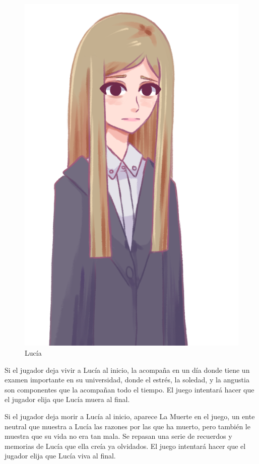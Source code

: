 \documentclass[12pt]{article}
\begin{document}
\begin{figure}
    \centering
    \includegraphics{imgs/lucia.png}
    \caption*{Lucía}
\end{figure}

Si el jugador deja vivir a Lucía al inicio, la acompaña en un día donde tiene un examen importante en su universidad, donde el estrés, la soledad, y la angustia son componentes que la acompañan todo el tiempo. El juego intentará hacer que el jugador elija que Lucía muera al final.

Si el jugador deja morir a Lucía al inicio, aparece La Muerte en el juego, un ente neutral que muestra a Lucía las razones por las que ha muerto, pero también le muestra que su vida no era tan mala. Se repasan una serie de recuerdos y memorias de Lucía que ella creía ya olvidados. El juego intentará hacer que el jugador elija que Lucía viva al final.
\end{document}
